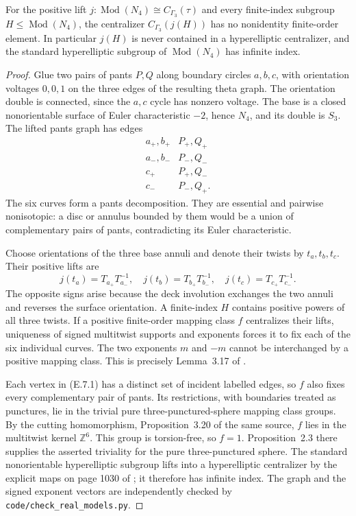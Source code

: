For the positive lift
$j:\operatorname{Mod}(N_4)\cong C_{\Gamma_3}(\tau)$ and
every finite-index subgroup $H\leq\operatorname{Mod}(N_4)$,
the centralizer $C_{\Gamma_3}(j(H))$ has no nonidentity
finite-order element.  In particular $j(H)$ is never
contained in a hyperelliptic centralizer, and the standard
hyperelliptic subgroup of $\operatorname{Mod}(N_4)$ has
infinite index.

\begin{proof}
Glue two pairs of pants $P,Q$ along boundary circles
$a,b,c$, with orientation voltages $0,0,1$ on the three
edges of the resulting theta graph.  The orientation
double is connected, since the $a,c$ cycle has nonzero
voltage.  The base is a closed nonorientable surface of
Euler characteristic $-2$, hence $N_4$, and its double
is $S_3$.  The lifted pants graph has edges
\[
\begin{array}{c|c}
 a_+,b_+&P_+,Q_+\\
 a_-,b_-&P_-,Q_-\\
 c_+&P_+,Q_-\\
 c_-&P_-,Q_+.
\end{array}                                                   \tag{E.7.1}
\]
The six curves form a pants decomposition.  They are
essential and pairwise nonisotopic: a disc or annulus
bounded by them would be a union of complementary pairs
of pants, contradicting its Euler characteristic.

Choose orientations of the three base annuli and denote
their twists by $t_a,t_b,t_c$.  Their positive lifts are
\[
 j(t_a)=T_{a_+}T_{a_-}^{-1},\quad
 j(t_b)=T_{b_+}T_{b_-}^{-1},\quad
 j(t_c)=T_{c_+}T_{c_-}^{-1}.                                  \tag{E.7.2}
\]
The opposite signs arise because the deck involution
exchanges the two annuli and reverses the surface
orientation.  A finite-index $H$ contains positive powers
of all three twists.  If a positive finite-order mapping
class $f$ centralizes their lifts, uniqueness of signed
multitwist supports and exponents forces it to fix each
of the six individual curves.  The two exponents $m$ and
$-m$ cannot be interchanged by a positive mapping class.
This is precisely Lemma~3.17 of \cite{CEFarbMargalit2011}.

Each vertex in (E.7.1) has a distinct set of incident
labelled edges, so $f$ also fixes every complementary
pair of pants.  Its restrictions, with boundaries treated
as punctures, lie in the trivial pure three-punctured-sphere
mapping class groups.  By the cutting homomorphism,
Proposition~3.20 of the same source, $f$ lies in the
multitwist kernel $\mathbb Z^6$.  This group is torsion-free,
so $f=1$.  Proposition~2.3 there supplies the asserted
triviality for the pure three-punctured sphere.  The
standard nonorientable hyperelliptic subgroup lifts into
a hyperelliptic centralizer by the explicit maps on page
1030 of \cite{CEStukow2016}; it therefore has infinite
index.  The graph and the signed exponent vectors are
independently checked by \texttt{code/check\_real\_models.py}.
\end{proof}

